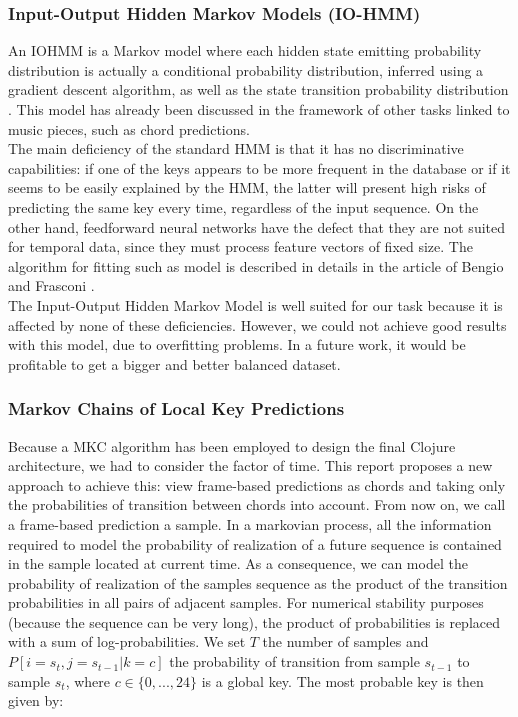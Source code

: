 \documentclass[letterpaper]{article}
\begin{document}
\subsubsection{Input-Output Hidden Markov Models (IO-HMM)}
\label{sssec:iohmm}

An IOHMM is a Markov model where each hidden state emitting probability distribution is actually a conditional probability distribution, inferred using a gradient descent algorithm, as well as the state transition probability distribution \citep{YB}. This model has already been discussed in the framework of other tasks linked to  music pieces, such as chord predictions. \\

The main deficiency of the standard HMM is that it has no discriminative capabilities: if one of the keys appears to be more frequent in the database or
if it seems to be easily explained by the HMM, the latter will present high risks of predicting the same key every time, regardless of the
input sequence. On the other hand, feedforward neural networks have the defect that they are not suited for temporal data, since they must 
process feature vectors of fixed size. The algorithm for fitting such as model is described in details in the article of Bengio and Frasconi \citep{YOYOHMM}.\\

The Input-Output Hidden Markov Model is well suited for our task because it is affected by none of these deficiencies.
However, we could not achieve good results with this model, due to overfitting problems. In a future work, it would be profitable to get a bigger and better balanced dataset.

\subsubsection{Markov Chains of Local Key Predictions}

Because a MKC algorithm has been employed to design the final Clojure architecture, we had to consider the factor of time. This report proposes a new approach to achieve this: view frame-based predictions as chords and taking only the probabilities of transition between chords into account. From now on, we call a frame-based prediction a sample. In a markovian process, all the information required to model the probability of realization of a future sequence is contained in the sample located at current time. As a consequence, we can model the probability of realization of the samples sequence as the product of the transition probabilities in all pairs of adjacent samples. For numerical stability purposes (because the sequence can be very long), the product of probabilities is replaced with a sum of log-probabilities. We set $T$ the number of samples and $P[i=s_t, j=s_{t-1} | k = c]$ the probability of transition from sample $s_{t-1}$ to sample $s_{t}$, where $c \in \{0, ..., 24\}$ is a global key. The most probable key is then given by:
\end{document}
